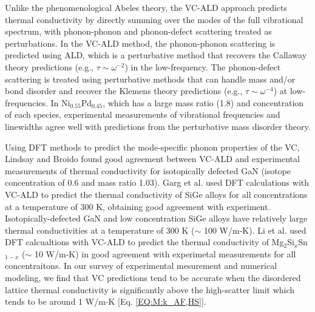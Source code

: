 \documentclass[aps,prb,onecolumn,preprint,footinbib,superscriptaddress,amsmath,amssymb,floatfix]{revtex4}
\begin{document}
Unlike the phenomenological 
Abeles theory, the VC-ALD approach predicts thermal conductivity 
by directly summing over the modes of the full vibrational spectrum, 
with phonon-phonon and phonon-defect scattering treated as 
perturbations.
\cite{garg_role_2011,tian_phonon_2012,lindsay_thermal_2012} 
In the VC-ALD method, the phonon-phonon scattering is  
predicted using ALD, which is a perturbative method that recovers the  
Callaway theory predictions (e.g., $\tau \sim \omega^{-2}$) 
in the low-frequency.\cite{callaway_model_1959} 
The phonon-defect scattering is treated 
using perturbative methods that can handle mass and/or bond disorder 
and recover the Klemens theory predictions 
(e.g., $\tau \sim \omega^{-4}$) at low-frequencies.
\cite{klemens_scattering_1955,klemens_thermal_1957,
mattis_phonon_1957,tamura_isotope_1983} 
In Ni$_{0.55}$Pd$_{0.45}$, 
which has a large mass ratio (1.8) and concentration of each species, 
experimental measurements of   
vibrational frequencies and linewidths agree well with 
predictions from the perturbative mass disorder theory.
\cite{mattis_phonon_1957,kamitakahara_vibrations_1974,
tamura_isotope_1983} 

Using DFT methods to predict 
the mode-specific phonon properties of the VC, Lindsay and Broido 
found good agreement between VC-ALD and experimental measurements of 
thermal conductivity for 
isotopically defected GaN (isotope concentration of 0.6 and 
mass ratio 1.03).\cite{lindsay_thermal_2012} 
Garg et al. used DFT calculations with VC-ALD   
to predict the thermal conductivity of SiGe alloys 
for all concentrations at a temperature of 300 K, 
obtaining good agreement with experiment.\cite{garg_role_2011}  
Isotopically-defected GaN and low concentration SiGe alloys 
have relatively large 
thermal conductivities at a temperature of 300 K ($\sim$ 100 W/m-K). 
Li et al. used DFT calcualtions with VC-ALD to predict the thermal 
conductivity of Mg$_2$Si$_x$Sn$_{1-x}$ ($\sim$ 10 W/m-K) 
in good agreement with 
experimetal measurements for all concentraitons.\cite{li_thermal_2012}
In our survey of experimental mesurement and numerical modeling, 
we find that 
VC predictions tend to be accurate when the disordered lattice 
thermal conductivity 
is significantly above the high-scatter limit which tends to 
be around 1 W/m-K [Eq. \eqref{EQ:M:k_AF,HS}].
\cite{abeles_lattice_1963,kamitakahara_vibrations_1974,
cahill_thermal_2004,cahill_thermal_2005,
cahill_lattice_1988,garg_role_2011,lindsay_thermal_2012} 
\end{document}
